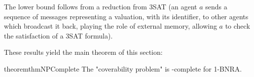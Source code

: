 %
%
%

The \NP lower bound follows from a reduction from 3SAT (an agent $a$ sends a sequence of messages representing a valuation, with its identifier, to other agents which broadcast it back, playing the role of external memory, allowing $a$ to check the satisfaction of a 3SAT formula).

These results yield the main theorem of this section:


\begin{restatable}{theorem}{thmNPComplete}
	\label{thm:np-complete-query-cover}
	The "coverability problem" is \NP-complete for 1-BNRA.
\end{restatable}

